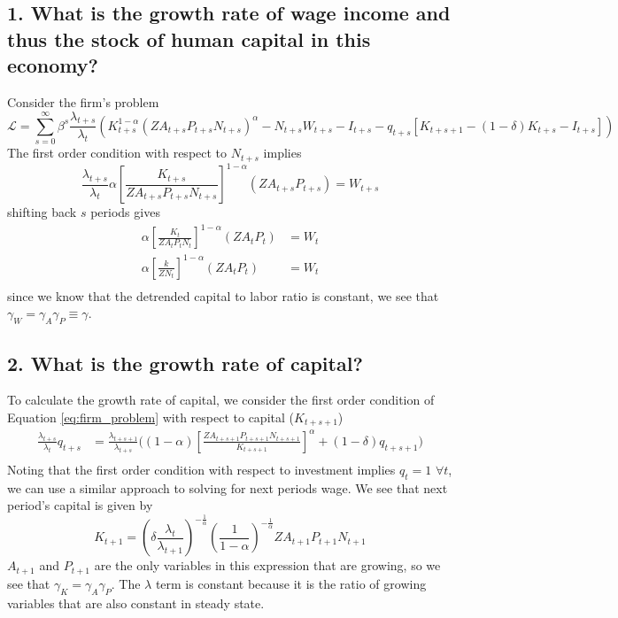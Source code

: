\documentclass[10pt,letter]{article}
\begin{document}
\subsection*{1. What is the growth rate of wage income and thus the stock of human capital in this economy?}
Consider the firm's problem 
\begin{equation}
	\mathcal{L} = \sum_{s = 0}^{\infty}\beta^s \frac{\lambda_{t+s}}{\lambda_t}\left(K_{t+s}^{1-\alpha}(ZA_{t+s}P_{t+s}N_{t+s})^\alpha -  N_{t+s}W_{t+s} - I_{t+s} - q_{t+s}\left[K_{t+s+1}-(1-\delta)K_{t+s}-I_{t+s}\right]\right)
	\label{eq:firm_problem}
\end{equation}
The first order condition with respect to $N_{t+s}$ implies 
\begin{equation*}
	\frac{\lambda_{t+s}}{\lambda_t} \alpha\left[ \frac{K_{t+s}}{ZA_{t+s}P_{t+s}N_{t+s}}\right]^{1-\alpha} (ZA_{t+s}P_{t+s}) = W_{t+s}
\end{equation*}
shifting back $s$ periods gives 
\begin{equation*}
\begin{split}
		 \alpha\left[ \frac{K_{t}}{ZA_{t}P_{t}N_{t}}\right]^{1-\alpha} (ZA_{t}P_{t}) &= W_{t}\\
		 \alpha\left[ \frac{k}{ZN_{t}}\right]^{1-\alpha} (ZA_{t}P_{t}) &= W_{t}\\
\end{split}
\end{equation*}
since we know that the detrended capital to labor ratio is constant, we see that $\gamma_W = \gamma_A \gamma_P \equiv \gamma$. 
\subsection*{2. What is the growth rate of capital?}
To calculate the growth rate of capital, we consider the first order condition of Equation \ref{eq:firm_problem} with respect to capital ($K_{t+s+1}$)
\begin{equation*}
\begin{split}
	\frac{\lambda_{t+s}}{\lambda_t}q_{t+s} &= \frac{\lambda_{t+s+1}}{\lambda_{t+s}}\bigg((1-\alpha)\left[\frac{ZA_{t+s+1}P_{t+s+1}N_{t+s+1}}{K_{t+s+1}}\right]^\alpha + (1-\delta) q_{t+s+1}\bigg)\\
\end{split}
\end{equation*}
Noting that the first order condition with respect to investment implies $q_t = 1$ $\forall t$, we can use a similar approach to solving for next periods wage. We see that next period's capital is given by 
\begin{equation*}
	K_{t+1} = (\delta \frac{\lambda_t}{\lambda_{t+1}})^{-\frac{1}{\alpha}}(\frac{1}{1-\alpha})^{-\frac{1}{\alpha}} Z A_{t+1}P_{t+1}N_{t+1}
\end{equation*}
$A_{t+1}$ and $P_{t+1}$ are the only variables in this expression that are growing, so we see that $\gamma_K = \gamma_A \gamma_P$.  The $\lambda$ term is constant because it is the ratio of growing variables that are also constant in steady state.  
\end{document}

